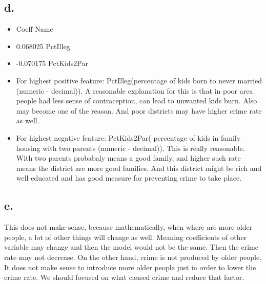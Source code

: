 \documentclass{article}
\begin{document}
\subsection*{d.}

\begin{itemize}
\item      Coeff                   Name
\item   0.068025             PctIlleg

\item -0.070175          PctKids2Par

\item For highest positive feature: PctIlleg(percentage of kids born to never married (numeric - decimal)). A reasonable explanation for this is that in poor area people had less sense of contraception, can lead to unwanted kids burn. Also may become one of the reason. And poor districts may have higher crime rate as well.
\item For highest negative feature: PctKids2Par( percentage of kids in family housing with two parents (numeric - decimal)). This is really reasonable. With two parents probabaly means a good family, and higher such rate means the district are more good families. And this district might be rich and well educated and has good measure for preventing crime to take place.

\end{itemize}



\subsection*{e.}
This does not make sense, because mathematically, when where are more older people, a lot of other things will change as well. Meaning coefficients of other variable may change and then the model would not be the same. Then the crime rate may not decrease. On the other hand, crime is not produced by older people. It does not make sense to introduce more older people just in order to lower the crime rate. We should focused on what caused crime and reduce that factor.
\end{document}
